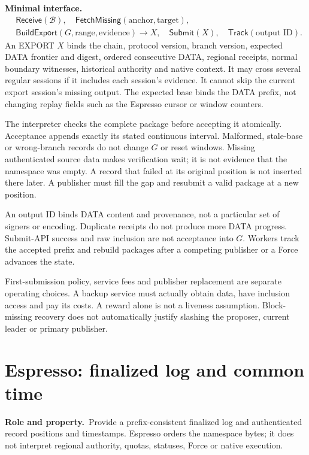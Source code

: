\documentclass[11pt,a4paper]{article}
\newcommand{\api}[1]{\ensuremath{\mathsf{#1}}}
\newcommand{\role}{\textbf{Role and property.}\ }
\newcommand{\iface}{\textbf{Minimal interface.}\ }
\begin{document}
\iface
\[
\begin{aligned}
 &\api{Receive}(\mathcal B),\quad
   \api{FetchMissing}(\text{anchor},\text{target}),\\
 &\api{BuildExport}(G,\text{range},\text{evidence})\to X,\quad
   \api{Submit}(X),\quad \api{Track}(\text{output ID}).
\end{aligned}
\]
An EXPORT $X$ binds the chain, protocol version, branch version, expected
DATA frontier and digest, ordered consecutive DATA, regional receipts, normal
boundary witnesses, historical authority and native context. It may
cross several regular sessions if it includes each session's evidence.
It cannot skip the current export session's missing output. The expected
base binds the DATA prefix, not changing replay fields such as the
Espresso cursor or window counters.

The interpreter checks the complete package before accepting it
atomically. Acceptance appends exactly its stated continuous interval.
Malformed, stale-base or wrong-branch records do not change $G$ or reset
windows. Missing authenticated source data makes verification wait;
it is not evidence that the namespace was empty. A record that failed
at its original position is not inserted there later. A publisher must
fill the gap and resubmit a valid package at a new position.

An output ID binds DATA content and provenance, not a particular set of
signers or encoding. Duplicate receipts do not produce more DATA
progress. Submit-API success and raw inclusion are not acceptance into
$G$. Workers track the accepted prefix and rebuild packages after a
competing publisher or a Force advances the state.

First-submission policy, service fees and publisher replacement are
separate operating choices. A backup service must actually obtain data,
have inclusion access and pay its costs. A reward alone is not a liveness
assumption. Block-missing recovery does not automatically justify
slashing the proposer, current leader or primary publisher.

\section{Espresso: finalized log and common time}\label{sec:espresso}
\role Provide a prefix-consistent finalized log and authenticated
record positions and timestamps. Espresso orders the namespace bytes;
it does not interpret regional authority, quotas, statuses, Force or
native execution.
\end{document}

